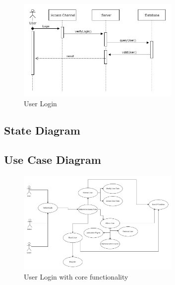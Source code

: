 \begin{figure}[H]
		\centering
		\includegraphics[width=0.7\textwidth]{user/img/UserSequence.jpg}
		\caption{User Login}
\end{figure}



\subsection{State Diagram}

\begin{figure}[H]
\end{figure}




\subsection{Use Case Diagram}

\begin{figure}[H]
		\centering
		\includegraphics[width=0.7\textwidth]{user/img/UserUseCase.jpg}
		\caption{User Login with core functionality }
\end{figure}



